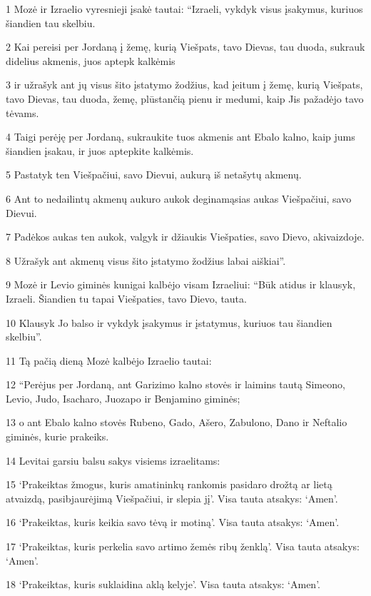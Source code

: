 \par 1 Mozė ir Izraelio vyresnieji įsakė tautai: “Izraeli, vykdyk visus įsakymus, kuriuos šiandien tau skelbiu. 
\par 2 Kai pereisi per Jordaną į žemę, kurią Viešpats, tavo Dievas, tau duoda, sukrauk didelius akmenis, juos aptepk kalkėmis 
\par 3 ir užrašyk ant jų visus šito įstatymo žodžius, kad įeitum į žemę, kurią Viešpats, tavo Dievas, tau duoda, žemę, plūstančią pienu ir medumi, kaip Jis pažadėjo tavo tėvams. 
\par 4 Taigi perėję per Jordaną, sukraukite tuos akmenis ant Ebalo kalno, kaip jums šiandien įsakau, ir juos aptepkite kalkėmis. 
\par 5 Pastatyk ten Viešpačiui, savo Dievui, aukurą iš netašytų akmenų. 
\par 6 Ant to nedailintų akmenų aukuro aukok deginamąsias aukas Viešpačiui, savo Dievui. 
\par 7 Padėkos aukas ten aukok, valgyk ir džiaukis Viešpaties, savo Dievo, akivaizdoje. 
\par 8 Užrašyk ant akmenų visus šito įstatymo žodžius labai aiškiai”. 
\par 9 Mozė ir Levio giminės kunigai kalbėjo visam Izraeliui: “Būk atidus ir klausyk, Izraeli. Šiandien tu tapai Viešpaties, tavo Dievo, tauta. 
\par 10 Klausyk Jo balso ir vykdyk įsakymus ir įstatymus, kuriuos tau šiandien skelbiu”. 
\par 11 Tą pačią dieną Mozė kalbėjo Izraelio tautai: 
\par 12 “Perėjus per Jordaną, ant Garizimo kalno stovės ir laimins tautą Simeono, Levio, Judo, Isacharo, Juozapo ir Benjamino giminės; 
\par 13 o ant Ebalo kalno stovės Rubeno, Gado, Ašero, Zabulono, Dano ir Neftalio giminės, kurie prakeiks. 
\par 14 Levitai garsiu balsu sakys visiems izraelitams: 
\par 15 ‘Prakeiktas žmogus, kuris amatininkų rankomis pasidaro drožtą ar lietą atvaizdą, pasibjaurėjimą Viešpačiui, ir slepia jį’. Visa tauta atsakys: ‘Amen’. 
\par 16 ‘Prakeiktas, kuris keikia savo tėvą ir motiną’. Visa tauta atsakys: ‘Amen’. 
\par 17 ‘Prakeiktas, kuris perkelia savo artimo žemės ribų ženklą’. Visa tauta atsakys: ‘Amen’. 
\par 18 ‘Prakeiktas, kuris suklaidina aklą kelyje’. Visa tauta atsakys: ‘Amen’. 
